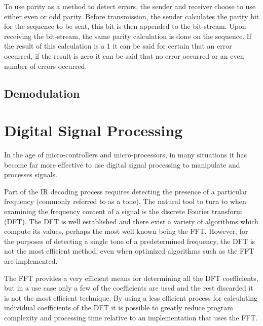  To use parity as a method to detect errors, the sender and receiver choose to use either even or odd parity. Before transmission, the sender calculates the parity bit for the sequence to be sent, this bit is then appended to the bit-stream. Upon receiving the bit-stream, the same parity calculation is done on the sequence. If the result of this calculation is a 1 it can be said for certain that an error occurred, if the result is zero it can be said that no error occurred or an even number of errors occurred.




\subsection{Demodulation}


\section{Digital Signal Processing}
In the age of micro-controllers and micro-processors, in many situations it has become far more effective to use digital signal processing to manipulate and processes signals.

Part of the IR decoding process requires detecting the presence of a particular frequency (commonly referred to as a tone). The natural tool to turn to when examining the frequency content of a signal is the discrete Fourier transform (DFT). The DFT is well established and there exist a variety of algorithms which compute its values, perhaps the most well known being the FFT. However, for the purposes of detecting a single tone of a predetermined frequency, the DFT is not the most efficient method, even when optimized algorithms such as the FFT are implemented.

The FFT provides a very efficient means for determining all the DFT coefficients, but in a use case only a few of the coefficients are used and the rest discarded it is not the most efficient technique. By using a less efficient process for calculating individual coefficients of the DFT it is possible to greatly reduce program complexity and processing time relative to an implementation that uses the FFT.

